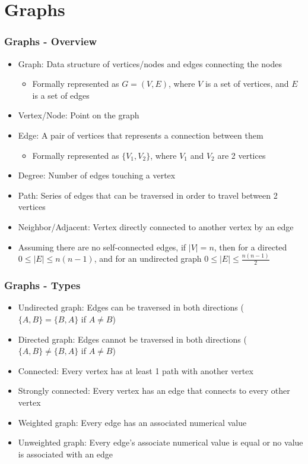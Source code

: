 \section{Graphs}
\begin{frame}\frametitle{Graphs - Overview}
\begin{itemize}
\item Graph: Data structure of vertices/nodes and edges connecting the nodes
	\begin{itemize}
	\item Formally represented as $G = (V, E)$, where $V$ is a set of vertices, and $E$ is a set of edges
	\end{itemize}
\item Vertex/Node: Point on the graph
\item Edge: A pair of vertices that represents a connection between them
	\begin{itemize}
	\item Formally represented as $\{V_1, V_2\}$, where $V_1$ and $V_2$ are 2 vertices
	\end{itemize}
\item Degree: Number of edges touching a vertex
\item Path: Series of edges that can be traversed in order to travel between 2 vertices
\item Neighbor/Adjacent: Vertex directly connected to another vertex by an edge
\item Assuming there are no self-connected edges, if $|V| = n$, then for a directed $0 \leq |E| \leq n(n - 1)$, and for an undirected graph $0 \leq |E| \leq \frac{n(n - 1)}{2}$
\end{itemize}
\end{frame}

\begin{frame}\frametitle{Graphs - Types}
\begin{itemize}
\item Undirected graph: Edges can be traversed in both directions ($\{A, B\} = \{B, A\}$ if $A \neq B$)
\item Directed graph: Edges cannot be traversed in both directions ($\{A, B\} \neq \{B, A\}$ if $A \neq B$)
\item Connected: Every vertex has at least 1 path with another vertex
\item Strongly connected: Every vertex has an edge that connects to every other vertex
\item Weighted graph: Every edge has an associated numerical value
\item Unweighted graph: Every edge's associate numerical value is equal or no value is associated with an edge
\end{itemize}
\end{frame}

